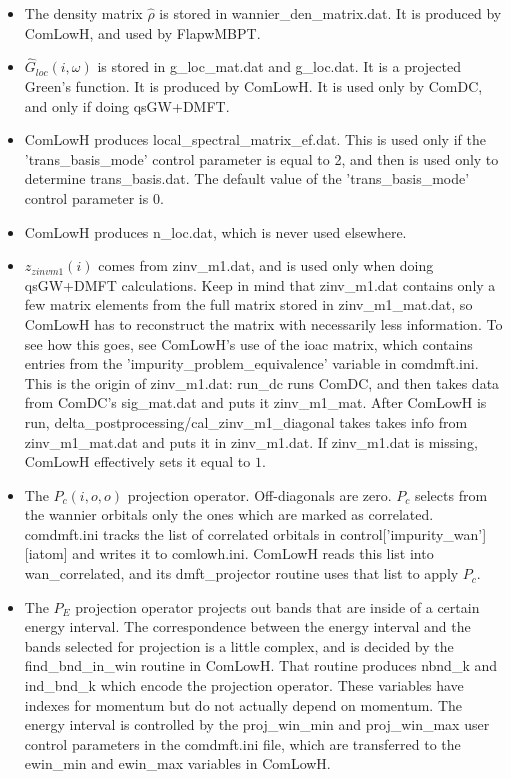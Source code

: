 \documentclass[aps,prb,singlecolumn,preprintnumbers,amsmath,amssymb]{revtex4}
\begin{document}
\begin{itemize}
\item The density matrix $\hat{\rho}$ is stored in  wannier\_den\_matrix.dat.  It is produced by ComLowH, and used by FlapwMBPT.
\item $\hat{G}_{loc}(i,\omega)$ is stored in  g\_loc\_mat.dat and g\_loc.dat. It is a projected Green's function.  It is produced by ComLowH.  It is used only by ComDC, and only if doing qsGW+DMFT.
\item ComLowH produces local\_spectral\_matrix\_ef.dat.  This is used only if the 'trans\_basis\_mode' control parameter is equal to 2, and then is used only to determine trans\_basis.dat.  The default value of the 'trans\_basis\_mode' control parameter is 0.
\item ComLowH produces n\_loc.dat, which is never used elsewhere.
\item $z_{zinvm1}(i)$ comes from zinv\_m1.dat, and is used only when doing qsGW+DMFT calculations. Keep in mind that zinv\_m1.dat contains only a few matrix elements from the full matrix stored in zinv\_m1\_mat.dat, so ComLowH has to reconstruct the matrix with necessarily less information.  To see how this goes, see ComLowH's use of the ioac matrix, which contains entries from the 'impurity\_problem\_equivalence' variable in comdmft.ini.  This is the origin of zinv\_m1.dat: run\_dc runs ComDC, and then takes data from ComDC's sig\_mat.dat and puts it zinv\_m1\_mat.  After ComLowH is run, delta\_postprocessing/cal\_zinv\_m1\_diagonal takes takes info from zinv\_m1\_mat.dat and puts it in zinv\_m1.dat. If zinv\_m1.dat is missing, ComLowH effectively sets it equal to $1$.  \\%
\item The  $P_c(i,o, o)$ projection operator.   Off-diagonals are zero. $P_c$ selects from the wannier orbitals only the ones which  are marked as correlated.  comdmft.ini tracks the list of correlated orbitals in control['impurity\_wan'][iatom] and writes it to comlowh.ini.  ComLowH reads this list into wan\_correlated, and its dmft\_projector routine uses that list to apply $P_c$.    %
\item  The $ P_E$ projection operator projects out bands that are inside of a certain energy interval. The correspondence between the energy interval and the bands selected for projection is a little complex, and is decided by the find\_bnd\_in\_win routine in ComLowH.  That routine produces nbnd\_k and ind\_bnd\_k which encode the projection operator.  These variables have indexes for momentum but do not actually depend on momentum.  The energy interval is controlled by the proj\_win\_min and proj\_win\_max user control parameters  in the comdmft.ini file, which are transferred to the ewin\_min and ewin\_max variables in ComLowH. 

\end{itemize}
\end{document}

